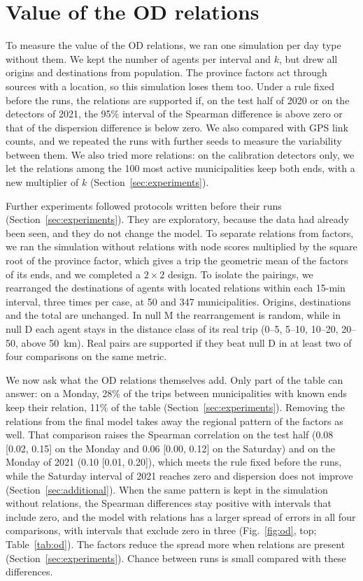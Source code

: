 \documentclass[11pt,a4paper]{article}
\begin{document}
\section{Value of the OD relations}
\label{sec:od_value}

To measure the value of the OD relations, we ran one simulation per day type without them. We kept the number of agents per interval and $k$, but drew all origins and destinations from population. The province factors act through sources with a location, so this simulation loses them too. Under a rule fixed before the runs, the relations are supported if, on the test half of 2020 or on the detectors of 2021, the 95\% interval of the Spearman difference is above zero or that of the dispersion difference is below zero. We also compared with GPS link counts, and we repeated the runs with further seeds to measure the variability between them. We also tried more relations: on the calibration detectors only, we let the relations among the 100 most active municipalities keep both ends, with a new multiplier of $k$ (Section~\ref{sec:experiments}).

Further experiments followed protocols written before their runs (Section~\ref{sec:experiments}). They are exploratory, because the data had already been seen, and they do not change the model. To separate relations from factors, we ran the simulation without relations with node scores multiplied by the square root of the province factor, which gives a trip the geometric mean of the factors of its ends, and we completed a $2\times 2$ design. To isolate the pairings, we rearranged the destinations of agents with located relations within each 15-min interval, three times per case, at 50 and 347 municipalities. Origins, destinations and the total are unchanged. In null M the rearrangement is random, while in null D each agent stays in the distance class of its real trip (0--5, 5--10, 10--20, 20--50, above 50~km). Real pairs are supported if they beat null D in at least two of four comparisons on the same metric.

We now ask what the OD relations themselves add. Only part of the table can answer: on a Monday, 28\% of the trips between municipalities with known ends keep their relation, 11\% of the table (Section~\ref{sec:experiments}). Removing the relations from the final model takes away the regional pattern of the factors as well. That comparison raises the Spearman correlation on the test half (0.08 [0.02, 0.15] on the Monday and 0.06 [0.00, 0.12] on the Saturday) and on the Monday of 2021 (0.10 [0.01, 0.20]), which meets the rule fixed before the runs, while the Saturday interval of 2021 reaches zero and dispersion does not improve (Section~\ref{sec:additional}). When the same pattern is kept in the simulation without relations, the Spearman differences stay positive with intervals that include zero, and the model with relations has a larger spread of errors in all four comparisons, with intervals that exclude zero in three (Fig.~\ref{fig:od}, top; Table~\ref{tab:od}). The factors reduce the spread more when relations are present (Section~\ref{sec:experiments}). Chance between runs is small compared with these differences.
\end{document}
